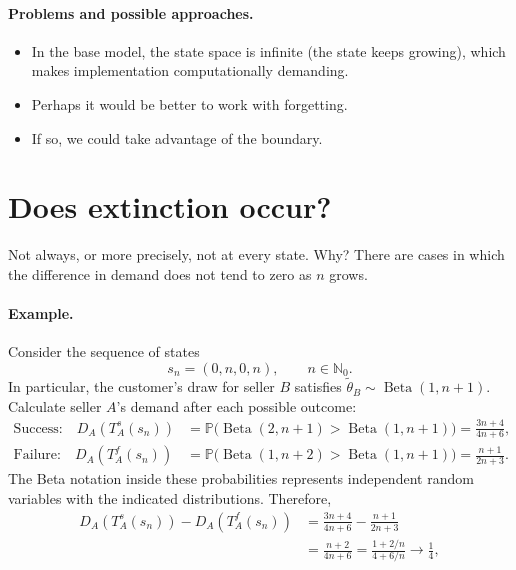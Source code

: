 \documentclass[11pt]{article}
\newcommand{\Pb}{\mathbb P}
\DeclareMathOperator{\Beta}{Beta}
\begin{document}
\paragraph{Problems and possible approaches.}
\begin{itemize}
\item In the base model, the state space is infinite (the state keeps
growing), which makes implementation computationally demanding.
\item Perhaps it would be better to work with forgetting.
\item If so, we could take advantage of the boundary.
\end{itemize}

\section{Does extinction occur?}

Not always, or more precisely, not at every state. Why? There are cases
in which the difference in demand does not tend to zero as $n$ grows.

\paragraph{Example.}
Consider the sequence of states
\begin{equation}
s_n=(0,n,0,n),\qquad n\in\mathbb N_0.
\end{equation}
In particular, the customer's draw for seller $B$ satisfies
$\widetilde\theta_B\sim\Beta(1,n+1)$. Calculate seller $A$'s demand
after each possible outcome:
\begin{align}
\text{Success:}\quad
D_A(T_A^s(s_n))
&=\Pb\bigl(\Beta(2,n+1)>\Beta(1,n+1)\bigr)
=\frac{3n+4}{4n+6},\label{eq:success-demand}\\[4pt]
\text{Failure:}\quad
D_A(T_A^f(s_n))
&=\Pb\bigl(\Beta(1,n+2)>\Beta(1,n+1)\bigr)
=\frac{n+1}{2n+3}.\label{eq:failure-demand}
\end{align}
The Beta notation inside these probabilities represents independent
random variables with the indicated distributions. Therefore,
\begin{equation}
\begin{aligned}
D_A(T_A^s(s_n))-D_A(T_A^f(s_n))
&=\frac{3n+4}{4n+6}-\frac{n+1}{2n+3}\\
&=\frac{n+2}{4n+6}
=\frac{1+2/n}{4+6/n}
\longrightarrow\frac14,
\end{aligned}
\end{equation}
\end{document}
